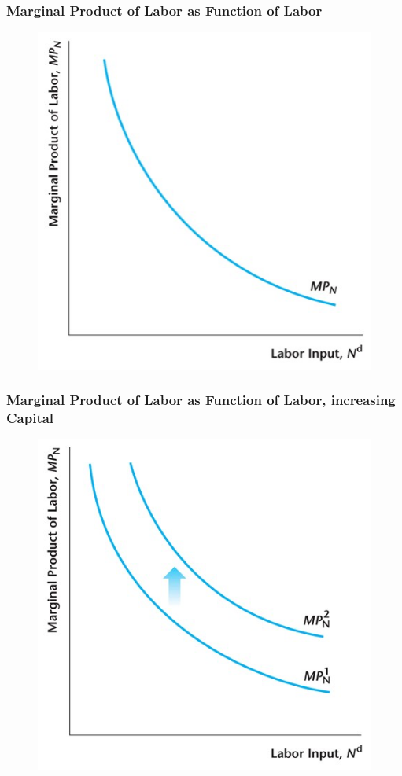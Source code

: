 \documentclass{beamer}
\begin{document}
\begin{frame}
\frametitle[alignment=center]{Marginal Product of Labor as Function of Labor}
\begin{figure}
\centering
\includegraphics[scale=0.5]{Figures/W_Fig_4pt14.png}
\end{figure}
\end{frame}

\begin{frame}
\frametitle[alignment=center]{Marginal Product of Labor as Function of Labor, increasing Capital}
\begin{figure}
\centering
\includegraphics[scale=0.5]{Figures/W_Fig_4pt15.png}
\end{figure}
\end{frame}
\end{document}
